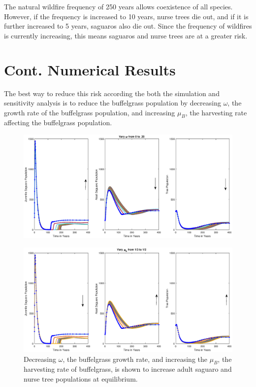\documentclass[size=custom,width=48 in,height=42 in, landscape]{sciposter}
\begin{document}
\begin{multicols}{3}
The natural wildfire frequency of 250 years allows coexistence of all species. However, if the frequency is increased to 10 years, nurse trees die out, and if it is further increased to 5 years, saguaros also die out. Since the frequency of wildfires is currently increasing, this means saguaros and nurse trees are at a greater risk.\\
\section{Cont. Numerical Results}
The best way to reduce this risk according the both the simulation and sensitivity analysis is to reduce the buffelgrass population by decreasing $\omega$, the growth rate of the buffelgrass population, and increasing $\mu_B$, the harvesting rate affecting the buffelgrass population.\\

\vspace{-1cm}
\begin{figure}
\hspace{1 cm}
\centering
\includegraphics[scale = 0.4]{VaryOmegaWbuffel.eps}
\end{figure}
\begin{figure}
\centering
\includegraphics[scale = 0.4]{VaryMubWbuffel.eps}
\tiny{\caption{Decreasing $\omega$, the buffelgrass growth rate, and increasing the $\mu_B$, the harvesting rate of buffelgrass, is shown to increase adult saguaro and nurse tree populations at equilibrium.}}
\end{figure}
\vspace{-4cm}

\end{multicols}
\end{document}

